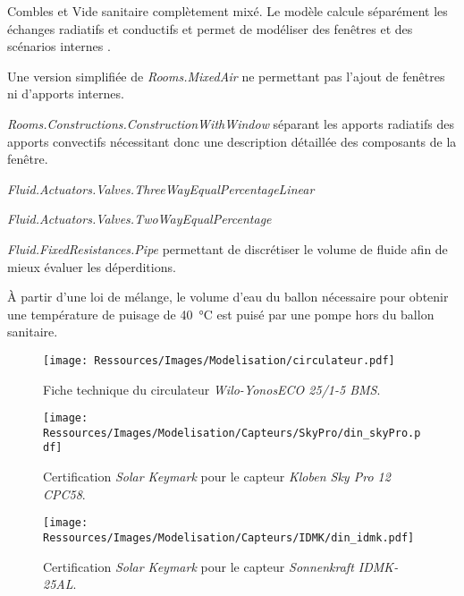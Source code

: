 \begin{blockdescription}{Combles et Vide sanitaire}
          complètement mixé. Le modèle calcule séparément les échanges radiatifs
          et conductifs et permet de modéliser des fenêtres et des scénarios
          internes \parencite{Wetter2011}.
    \item [Combles et Vide sanitaire] Une version simplifiée de \textit{Rooms.MixedAir}
          ne permettant pas l’ajout de fenêtres ni d’apports internes.
    \item [Fenêtres] \textit{Rooms.Constructions.ConstructionWithWindow} séparant
          les apports radiatifs des apports convectifs nécessitant donc une description
          détaillée des composants de la fenêtre.
    \item [Vanne $\bm{3}$ voies] \textit{Fluid.Actuators.Valves.ThreeWayEqualPercentageLinear}
    \item [Vanne $\bm{2}$ voies] \textit{Fluid.Actuators.Valves.TwoWayEqualPercentage}
    \item [Canalisation extérieures] \textit{Fluid.FixedResistances.Pipe} permettant
          de discrétiser le volume de fluide afin de mieux évaluer les déperditions.
    \item [Puisage] À partir d’une loi de mélange, le volume d’eau du ballon nécessaire
          pour obtenir une température de puisage de \SI{40}{\celsius} est puisé
          par une pompe hors du ballon sanitaire.
\end{blockdescription}
\clearpage


\begin{figure}
    \centering
    \texttt{[image: Ressources/Images/Modelisation/circulateur.pdf]}
    \caption[Fiche technique du circulateur \textit{Wilo-YonosECO 25/1-5 BMS}]
            {Fiche technique du circulateur \textit{Wilo-YonosECO 25/1-5 BMS}.}
    \label{fig:caracs_pompes}
\end{figure}

\begin{figure}
    \centering
    \texttt{[image: Ressources/Images/Modelisation/Capteurs/SkyPro/din\_skyPro.pdf]}
    \caption[Certification \textit{Solar Keymark} pour le capteur \textit{Kloben Sky Pro 12 CPC58}]
            {Certification \textit{Solar Keymark} pour le capteur \textit{Kloben Sky Pro 12 CPC58}.}
    \label{fig:caracs_skypro}
\end{figure}


\begin{figure}
    \centering
    \texttt{[image: Ressources/Images/Modelisation/Capteurs/IDMK/din\_idmk.pdf]}
    \caption[Certification \textit{Solar Keymark} pour le capteur \textit{Sonnenkraft IDMK-25AL}]
            {Certification \textit{Solar Keymark} pour le capteur \textit{Sonnenkraft IDMK-25AL}.}
    \label{fig:caracs_idmk}
\end{figure}


